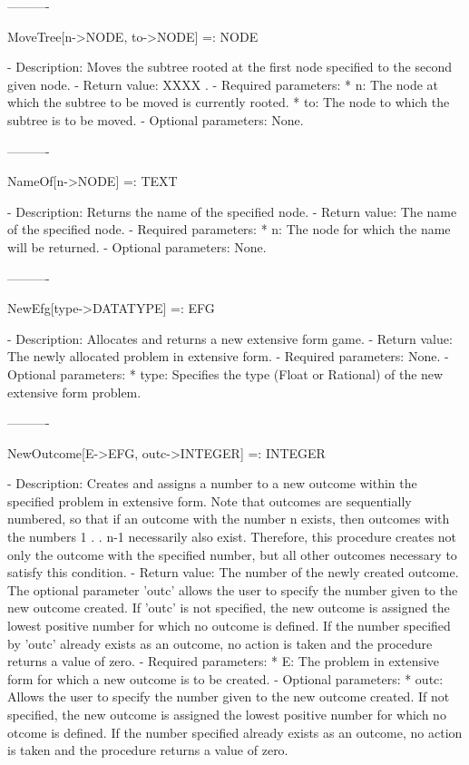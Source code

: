 ----------

MoveTree[n->NODE, to->NODE] =: NODE

   -	Description:  Moves the subtree rooted at the first node specified to
	the second given node.
   -	Return value:  XXXX .
   -	Required parameters:
	  *  n:  The node at which the subtree to be moved is currently rooted.
	  *  to:  The node to which the subtree is to be moved.
   -	Optional parameters:  None.

----------

NameOf[n->NODE] =: TEXT

   -	Description:  Returns the name of the specified node.
   -	Return value:  The name of the specified node.
   -	Required parameters:
	   *  n:  The node for which the name will be returned.
   -	Optional parameters:  None.

----------

NewEfg[{type->DATATYPE}] =: EFG

   -	Description:  Allocates and returns a new extensive form game.
   -	Return value:  The newly allocated problem in extensive form.
   -	Required parameters:  None.
   -	Optional parameters: 
	  *  type:  Specifies the type (Float or Rational) of the new extensive
		form problem.

----------

NewOutcome[E->EFG, {outc->INTEGER}] =: INTEGER

   -	Description:  Creates and assigns a number to a new outcome within the
	specified problem in extensive form.  Note that outcomes are 
	sequentially numbered, so that if an outcome with the number n exists,
	then outcomes with the numbers 1 . . n-1 necessarily also exist.
	Therefore, this procedure creates not only the outcome with the 
	specified number, but all other outcomes necessary to satisfy this 
	condition.
   -	Return value:  The number of the newly created outcome.  The optional 
	parameter 'outc' allows the user to specify the number given to the new
	outcome created.  If 'outc' is not specified, the new outcome is 
	assigned the lowest positive number for which no outcome is defined.  
	If the number specified by 'outc' already exists as an outcome, no 
	action is taken and the procedure returns a value of zero.
   -	Required parameters:
	  *  E:  The problem in extensive form for which a new outcome is to
	     be created.
   -	Optional parameters:
	  *  outc:  Allows the user to specify the number given to the new 
	     outcome created.  If not specified, the new outcome is assigned
	     the lowest positive number for which no otcome is defined.  If the
	     number specified already exists as an outcome, no action is taken
	     and the procedure returns a value of zero.

